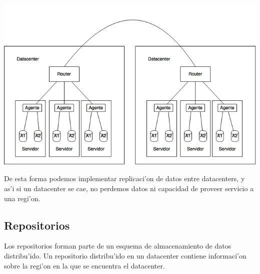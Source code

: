 \includegraphics[width=15cm]{diagramas/datacenterx2.png}

\noindent
De esta forma podemos implementar replicaci'on de datos entre datacenters, y as'i si un datacenter se cae, no perdemos datos ni capacidad de proveer servicio a una regi'on.

\subsection{Repositorios}

Los repositorios forman parte de un esquema de almacenamiento de datos distribu'ido. Un repositorio distribu'ido en un datacenter contiene informaci'on sobre la regi'on en la que se encuentra el datacenter.

